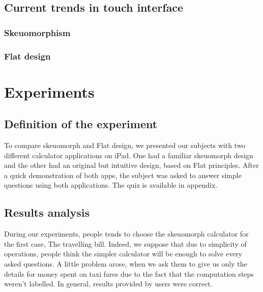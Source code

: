 \documentclass[a4paper,11pt] {article}
\theoremstyle{definition}
\begin{document}
    \subsection{Current trends in touch interface}
        \subsubsection{Skeuomorphism}
        \subsubsection{Flat design}


\section{Experiments}
\label{sct:experiment}

    \subsection{Definition of the experiment}

    To compare skeuomorph and Flat design, we presented our subjects with two different calculator applications on iPad. One had a familiar skeuomorph design and the other had an original but intuitive design, based on Flat principles. After a quick demonstration of both apps, the subject was asked to answer simple questions using both applications. The quiz is available in appendix.\\


    \subsection{Results analysis}
    
    During our experiments, people tends to choose the skeuomorph calculator for the first case, The travelling bill. Indeed, we suppose that due to simplicity of operations, people think the simpler calculator will be enough to solve every asked questions. A little problem arose, when we ask them to give us only the details for money spent on taxi fares due to the fact that the computation steps weren't labelled. In general, results provided by users were correct.\\
    
\end{document}
